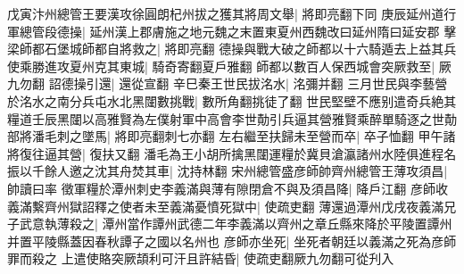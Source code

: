 戊寅汴州總管王要漢攻徐圓朗杞州拔之獲其將周文舉|{
	將即亮翻下同}
庚辰延州道行軍總管段德操|{
	延州漢上郡膚施之地元魏之末置東夏州西魏改曰延州隋曰延安郡}
擊梁師都石堡城師都自將救之|{
	將即亮翻}
德操與戰大破之師都以十六騎遁去上益其兵使乘勝進攻夏州克其東城|{
	騎奇寄翻夏戶雅翻}
師都以數百人保西城會突厥救至|{
	厥九勿翻}
詔德操引還|{
	還從宣翻}
辛巳秦王世民拔洺水|{
	洺彌并翻}
三月世民與李藝營於洺水之南分兵屯水北黑闥數挑戰|{
	數所角翻挑徒了翻}
世民堅壁不應别遣奇兵絶其糧道壬辰黑闥以高雅賢為左僕射軍中高會李世勣引兵逼其營雅賢乘醉單騎逐之世勣部將潘毛刺之墜馬|{
	將即亮翻刺七亦翻}
左右繼至扶歸未至營而卒|{
	卒子恤翻}
甲午諸將復往逼其營|{
	復扶又翻}
潘毛為王小胡所擒黑闥運糧於冀貝滄瀛諸州水陸俱進程名振以千餘人邀之沈其舟焚其車|{
	沈持林翻}
宋州總管盛彦師帥齊州總管王薄攻須昌|{
	帥讀曰率}
徵軍糧於潭州刺史李義滿與薄有隙閉倉不與及須昌降|{
	降戶江翻}
彦師收義滿繫齊州獄詔釋之使者未至義滿憂憤死獄中|{
	使疏吏翻}
薄還過潭州戊戌夜義滿兄子武意執薄殺之|{
	潭州當作譚州武德二年李義滿以齊州之章丘縣來降於平陵置譚州并置平陵縣蓋因春秋譚子之國以名州也}
彦師亦坐死|{
	坐死者朝廷以義滿之死為彦師罪而殺之}
上遣使賂突厥頡利可汗且許結昏|{
	使疏吏翻厥九勿翻可從刋入}


